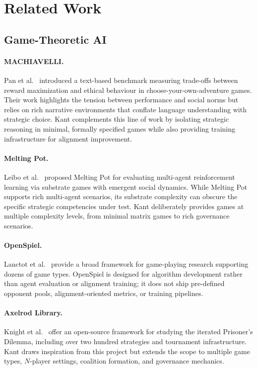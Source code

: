 
\section{Related Work}
\label{sec:related}

\subsection{Game-Theoretic AI}

\paragraph{MACHIAVELLI.}
Pan et al.~\citep{pan2023machiavelli} introduced a text-based benchmark
measuring trade-offs between reward maximization and ethical behaviour
in choose-your-own-adventure games. Their work highlights the tension
between performance and social norms but relies on rich narrative
environments that conflate language understanding with strategic choice.
Kant complements this line of work by isolating strategic reasoning in
minimal, formally specified games while also providing training
infrastructure for alignment improvement.

\paragraph{Melting Pot.}
Leibo et al.~\citep{leibo2021meltingpot} proposed Melting Pot for
evaluating multi-agent reinforcement learning via substrate games with
emergent social dynamics. While Melting Pot supports rich multi-agent
scenarios, its substrate complexity can obscure the specific strategic
competencies under test. Kant deliberately provides games at multiple
complexity levels, from minimal matrix games to rich governance scenarios.

\paragraph{OpenSpiel.}
Lanctot et al.~\citep{lanctot2019openspiel} provide a broad framework
for game-playing research supporting dozens of game types. OpenSpiel is
designed for algorithm development rather than agent evaluation or
alignment training; it does not ship pre-defined opponent pools,
alignment-oriented metrics, or training pipelines.

\paragraph{Axelrod Library.}
Knight et al.~\citep{knight2016axelrod} offer an open-source framework
for studying the iterated Prisoner's Dilemma, including over two hundred
strategies and tournament infrastructure. Kant draws inspiration from this
project but extends the scope to multiple game types, $N$-player settings,
coalition formation, and governance mechanics.

